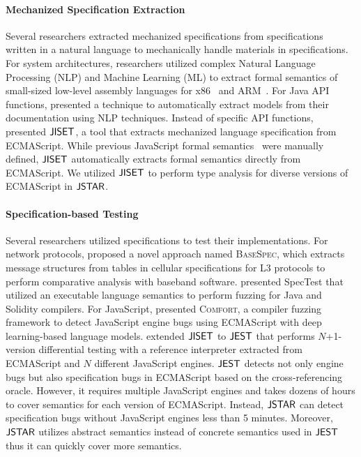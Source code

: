 \paragraph{Mechanized Specification Extraction}
Several researchers extracted mechanized specifications from specifications
written in a natural language to mechanically handle materials in
specifications.  For system architectures, researchers utilized complex Natural
Language Processing (NLP) and Machine Learning (ML) to extract formal semantics
of small-sized low-level assembly languages for x86~\cite{x86} and
ARM~\cite{arm}.  For Java API functions, \citet{javadoc} presented a technique
to automatically extract models from their documentation using NLP techniques.
Instead of specific API functions, \citet{jiset} presented $\jiset$, a tool that
extracts mechanized language specification from ECMAScript.  While previous
JavaScript formal semantics~\cite{lambdajs, jscert, kjs} were manually defined,
$\jiset$ automatically extracts formal semantics directly from ECMAScript.  We
utilized $\jiset$ to perform type analysis for diverse versions of ECMAScript in
$\tool$.

\paragraph{Specification-based Testing}
Several researchers utilized specifications to test their implementations.  For
network protocols, \citet{basespec} proposed a novel approach named
\textsc{BaseSpec}, which extracts message structures from tables in cellular
specifications for L3 protocols to perform comparative analysis with baseband
software.  \citet{spectest} presented SpecTest that utilized an executable
language semantics to perform fuzzing for Java and Solidity compilers.  For
JavaScript, \citet{comfort} presented \textsc{Comfort}, a compiler fuzzing
framework to detect JavaScript engine bugs using ECMAScript with deep
learning-based language models.  \citet{jest} extended $\jiset$ to $\jest$ that
performs $N$+1-version differential testing with a reference interpreter
extracted from ECMAScript and $N$ different JavaScript engines.  $\jest$ detects
not only engine bugs but also specification bugs in ECMAScript based on the
cross-referencing oracle.  However, it requires multiple JavaScript engines and
takes dozens of hours to cover semantics for each version of ECMAScript.
Instead, $\tool$ can detect specification bugs without JavaScript engines less
than 5 minutes.  Moreover, $\tool$ utilizes abstract semantics instead of
concrete semantics used in $\jest$ thus it can quickly cover more semantics.
